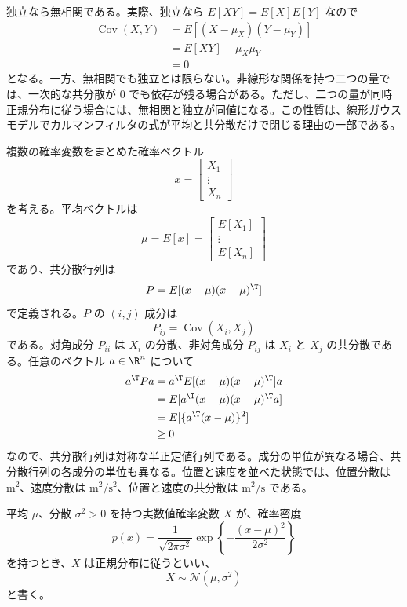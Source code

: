 独立なら無相関である。実際、独立なら $E[XY]=E[X]E[Y]$ なので
\begin{align}
  \operatorname{Cov}(X,Y)
  &=E[(X-\mu_X)(Y-\mu_Y)]\\
  &=E[XY]-\mu_X\mu_Y\\
  &=0
\end{align}
となる。一方、無相関でも独立とは限らない。非線形な関係を持つ二つの量では、一次的な共分散が 0 でも依存が残る場合がある。ただし、二つの量が同時正規分布に従う場合には、無相関と独立が同値になる。この性質は、線形ガウスモデルでカルマンフィルタの式が平均と共分散だけで閉じる理由の一部である。

複数の確率変数をまとめた確率ベクトル
\begin{equation}
  x=
  \begin{bmatrix}
    X_1\\
    \vdots\\
    X_n
  \end{bmatrix}
\end{equation}
を考える。平均ベクトルは
\begin{equation}
  \mu=E[x]
  =
  \begin{bmatrix}
    E[X_1]\\
    \vdots\\
    E[X_n]
  \end{bmatrix}
\end{equation}
であり、共分散行列は
\begin{equation}
  P=E[(x-\mu)(x-\mu)^\T]
\end{equation}
で定義される。$P$ の $(i,j)$ 成分は
\begin{equation}
  P_{ij}=\operatorname{Cov}(X_i,X_j)
\end{equation}
である。対角成分 $P_{ii}$ は $X_i$ の分散、非対角成分 $P_{ij}$ は $X_i$ と $X_j$ の共分散である。任意のベクトル $a\in\R^n$ について
\begin{align}
  a^\T Pa
  &=a^\T E[(x-\mu)(x-\mu)^\T]a\\
  &=E[a^\T(x-\mu)(x-\mu)^\T a]\\
  &=E[\{a^\T(x-\mu)\}^2]\\
  &\ge0
\end{align}
なので、共分散行列は対称な半正定値行列である。成分の単位が異なる場合、共分散行列の各成分の単位も異なる。位置と速度を並べた状態では、位置分散は $\mathrm{m^2}$、速度分散は $\mathrm{m^2/s^2}$、位置と速度の共分散は $\mathrm{m^2/s}$ である。

\begin{definition}[正規分布]
平均 $\mu$、分散 $\sigma^2>0$ を持つ実数値確率変数 $X$ が、確率密度
\begin{equation}
  p(x)=\frac{1}{\sqrt{2\pi\sigma^2}}
  \exp\left\{-\frac{(x-\mu)^2}{2\sigma^2}\right\}
\end{equation}
を持つとき、$X$ は正規分布に従うといい、
\begin{equation}
  X\sim\mathcal{N}(\mu,\sigma^2)
\end{equation}
と書く。
\end{definition}

